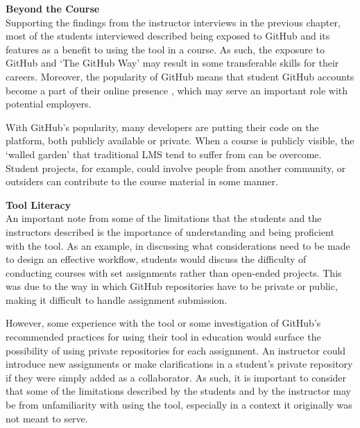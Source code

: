 \textbf{Beyond the Course} \\
Supporting the findings from the instructor interviews in the previous chapter, most of the students interviewed described being exposed to GitHub and its features as a benefit to using the tool in a course. As such, the exposure to GitHub and `The GitHub Way' may result in some transferable skills for their careers. Moreover, the popularity of GitHub means that student GitHub accounts become a part of their online presence \cite{treude2012programming}, which may serve an important role with potential employers.

With GitHub's popularity, many developers are putting their code on the platform, both publicly available or private. When a course is publicly visible, the `walled garden' that traditional LMS tend to suffer from \cite{mott2010envisioning} can be overcome. Student projects, for example, could involve people from another community, or outsiders can contribute to the course material in some manner.

\textbf{Tool Literacy} \\
An important note from some of the limitations that the students and the instructors described is the importance of understanding and being proficient with the tool. As an example, in discussing what considerations need to be made to design an effective workflow, students would discuss the difficulty of conducting courses with set assignments rather than open-ended projects. This was due to the way in which GitHub repositories have to be private or public, making it difficult to handle assignment submission.

However, some experience with the tool or some investigation of GitHub's recommended practices for using their tool in education would surface the possibility of using private repositories for each assignment. An instructor could introduce new assignments or make clarifications in a student's private repository if they were simply added as a collaborator. As such, it is important to consider that some of the limitations described by the students and by the instructor may be from unfamiliarity with using the tool, especially in a context it originally was not meant to serve.



